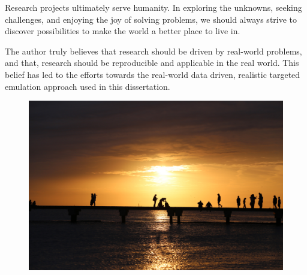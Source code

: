 \documentclass[12pt]{report}
\begin{document}
Research projects ultimately serve humanity. In exploring the unknowns, seeking challenges, and enjoying the joy of solving problems, we should always strive to discover possibilities to make the world a better place to live in.

The author truly believes that research should be driven by real-world problems, and that, research should be reproducible and applicable in the real world. This belief has led to the efforts towards the real-world data driven, realistic targeted emulation approach used in this dissertation.

\vspace{4em}

\begin{figure}[h]
  \begin{center}
  \includegraphics[width=.8\textwidth]{figures/postface.jpg}
  \end{center}
\end{figure}
\end{document}

